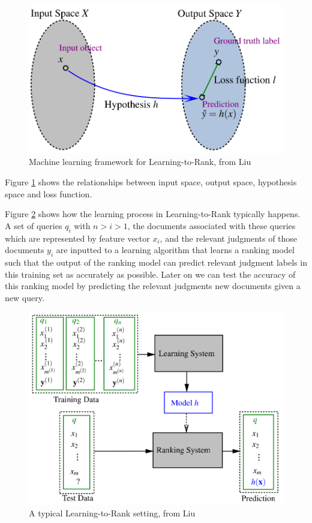 \begin{figure}[!h]
\includegraphics[scale=0.26]{gfx/descriminative_training}
\caption{Machine learning framework for Learning-to-Rank, from Liu\cite{Liu2007}}
\label{fig:discriminative_training}
\end{figure}
Figure \ref{fig:discriminative_training} shows the relationships between input space, output space, hypothesis space and loss function.

Figure \ref{ref:ltr_framework} shows how the learning process in Learning-to-Rank typically happens. A set of queries $q_i$ with $n > i > 1$, the documents associated with these queries which are represented by feature vector $x_i$, and the relevant judgments of those documents $y_i$ are inputted to a learning algorithm that learns a ranking model such that the output of the ranking model can predict relevant judgment labels in this training set as accurately as possible. Later on we can test the accuracy of this ranking model by predicting the relevant judgments new documents given a new query.
\begin{figure}[!h]
\includegraphics[scale=0.25]{gfx/ltr_framework}
\caption{A typical Learning-to-Rank setting, from Liu\cite{Liu2007}}
\label{ref:ltr_framework}
\end{figure}\\

